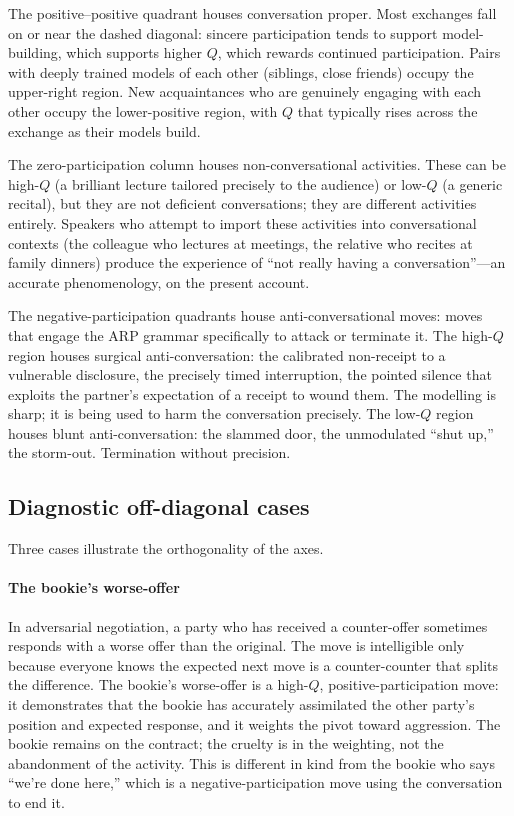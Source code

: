The positive--positive quadrant houses conversation proper. Most exchanges fall on or near the dashed diagonal: sincere participation tends to support model-building, which supports higher $Q$, which rewards continued participation. Pairs with deeply trained models of each other (siblings, close friends) occupy the upper-right region. New acquaintances who are genuinely engaging with each other occupy the lower-positive region, with $Q$ that typically rises across the exchange as their models build.

The zero-participation column houses non-conversational activities. These can be high-$Q$ (a brilliant lecture tailored precisely to the audience) or low-$Q$ (a generic recital), but they are not deficient conversations; they are different activities entirely. Speakers who attempt to import these activities into conversational contexts (the colleague who lectures at meetings, the relative who recites at family dinners) produce the experience of ``not really having a conversation''---an accurate phenomenology, on the present account.

The negative-participation quadrants house anti-conversational moves: moves that engage the ARP grammar specifically to attack or terminate it. The high-$Q$ region houses surgical anti-conversation: the calibrated non-receipt to a vulnerable disclosure, the precisely timed interruption, the pointed silence that exploits the partner's expectation of a receipt to wound them. The modelling is sharp; it is being used to harm the conversation precisely. The low-$Q$ region houses blunt anti-conversation: the slammed door, the unmodulated ``shut up,'' the storm-out. Termination without precision.

\subsection{Diagnostic off-diagonal cases}

Three cases illustrate the orthogonality of the axes.

\paragraph{The bookie's worse-offer} In adversarial negotiation, a party who has received a counter-offer sometimes responds with a worse offer than the original. The move is intelligible only because everyone knows the expected next move is a counter-counter that splits the difference. The bookie's worse-offer is a high-$Q$, positive-participation move: it demonstrates that the bookie has accurately assimilated the other party's position and expected response, and it weights the pivot toward aggression. The bookie remains on the contract; the cruelty is in the weighting, not the abandonment of the activity. This is different in kind from the bookie who says ``we're done here,'' which is a negative-participation move using the conversation to end it.

